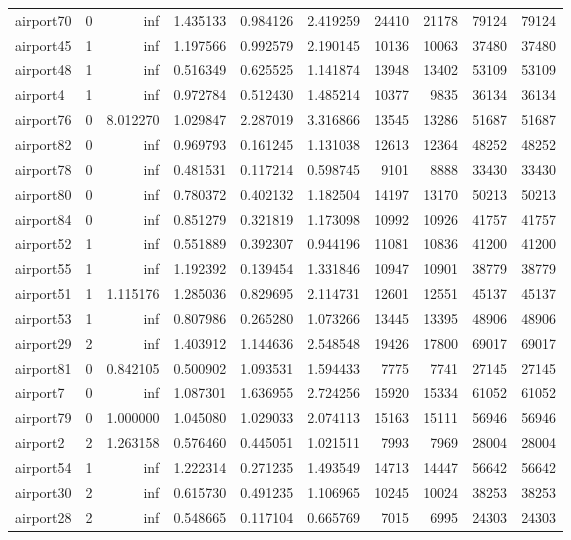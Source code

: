 \begin{longtable}{|l|r|r|r|r|r|r|r|r|r|}
airport70 & 0 & inf & 1.435133 & 0.984126 & 2.419259 & 24410 & 21178 & 79124 & 79124 \\
airport45 & 1 & inf & 1.197566 & 0.992579 & 2.190145 & 10136 & 10063 & 37480 & 37480 \\
airport48 & 1 & inf & 0.516349 & 0.625525 & 1.141874 & 13948 & 13402 & 53109 & 53109 \\
airport4 & 1 & inf & 0.972784 & 0.512430 & 1.485214 & 10377 & 9835 & 36134 & 36134 \\
airport76 & 0 & 8.012270 & 1.029847 & 2.287019 & 3.316866 & 13545 & 13286 & 51687 & 51687 \\
airport82 & 0 & inf & 0.969793 & 0.161245 & 1.131038 & 12613 & 12364 & 48252 & 48252 \\
airport78 & 0 & inf & 0.481531 & 0.117214 & 0.598745 & 9101 & 8888 & 33430 & 33430 \\
airport80 & 0 & inf & 0.780372 & 0.402132 & 1.182504 & 14197 & 13170 & 50213 & 50213 \\
airport84 & 0 & inf & 0.851279 & 0.321819 & 1.173098 & 10992 & 10926 & 41757 & 41757 \\
airport52 & 1 & inf & 0.551889 & 0.392307 & 0.944196 & 11081 & 10836 & 41200 & 41200 \\
airport55 & 1 & inf & 1.192392 & 0.139454 & 1.331846 & 10947 & 10901 & 38779 & 38779 \\
airport51 & 1 & 1.115176 & 1.285036 & 0.829695 & 2.114731 & 12601 & 12551 & 45137 & 45137 \\
airport53 & 1 & inf & 0.807986 & 0.265280 & 1.073266 & 13445 & 13395 & 48906 & 48906 \\
airport29 & 2 & inf & 1.403912 & 1.144636 & 2.548548 & 19426 & 17800 & 69017 & 69017 \\
airport81 & 0 & 0.842105 & 0.500902 & 1.093531 & 1.594433 & 7775 & 7741 & 27145 & 27145 \\
airport7 & 0 & inf & 1.087301 & 1.636955 & 2.724256 & 15920 & 15334 & 61052 & 61052 \\
airport79 & 0 & 1.000000 & 1.045080 & 1.029033 & 2.074113 & 15163 & 15111 & 56946 & 56946 \\
airport2 & 2 & 1.263158 & 0.576460 & 0.445051 & 1.021511 & 7993 & 7969 & 28004 & 28004 \\
airport54 & 1 & inf & 1.222314 & 0.271235 & 1.493549 & 14713 & 14447 & 56642 & 56642 \\
airport30 & 2 & inf & 0.615730 & 0.491235 & 1.106965 & 10245 & 10024 & 38253 & 38253 \\
airport28 & 2 & inf & 0.548665 & 0.117104 & 0.665769 & 7015 & 6995 & 24303 & 24303 \\

\end{longtable}
